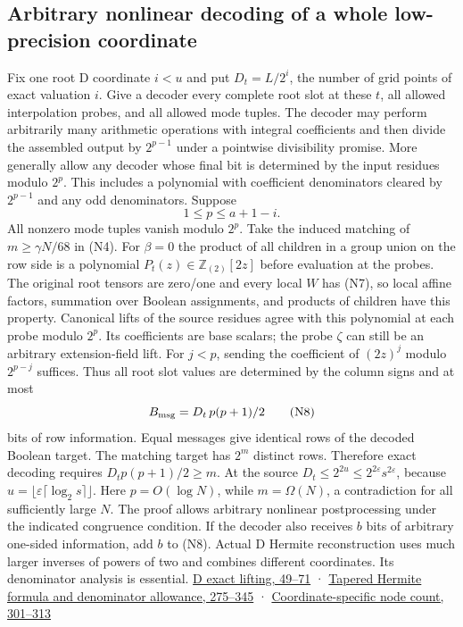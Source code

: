 \documentclass[
  11pt,
]{article}
\begin{document}
\subsection{Arbitrary nonlinear decoding of a whole low-precision
coordinate}\label{v8-arbitrary-nonlinear-decoding-of-a-whole-low-precision-coordinate}

Fix one root D coordinate \(i<u\) and put \(D_t=L/2^i\), the number of
grid points of exact valuation \(i\). Give a decoder every complete root
slot at these \(t\), all allowed interpolation probes, and all allowed
mode tuples. The decoder may perform arbitrarily many arithmetic
operations with integral coefficients and then divide the assembled
output by \(2^{p-1}\) under a pointwise divisibility promise. More
generally allow any decoder whose final bit is determined by the input
residues modulo \(2^p\). This includes a polynomial with coefficient
denominators cleared by \(2^{p-1}\) and any odd denominators. Suppose \[
 1\le p\le a+1-i.
\] All nonzero mode tuples vanish modulo \(2^p\). Take the induced
matching of \(m\ge \gamma N/68\) in (N4). For \(\beta=0\) the product of
all children in a group union on the row side is a polynomial
\(P_t(z)\in\mathbb Z_{(2)}[2z]\) before evaluation at the probes. The
original root tensors are zero/one and every local \(W\) has (N7), so
local affine factors, summation over Boolean assignments, and products
of children have this property. Canonical lifts of the source residues
agree with this polynomial at each probe modulo \(2^p\). Its
coefficients are base scalars; the probe \(\zeta\) can still be an
arbitrary extension-field lift. For \(j<p\), sending the coefficient of
\((2z)^j\) modulo \(2^{p-j}\) suffices. Thus all root slot values are
determined by the column signs and at most \[
 B_{\rm msg}=D_t\,p(p+1)/2
\tag{N8}
\] bits of row information. Equal messages give identical rows of the
decoded Boolean target. The matching target has \(2^m\) distinct rows.
Therefore exact decoding requires \(D_t p(p+1)/2\ge m\). At the source
\(D_t\le 2^{2u}\le 2^{2\varepsilon}s^{2\varepsilon}\), because
\(u=\lfloor\varepsilon\lceil\log_2 s\rceil\rfloor\). Here
\(p=O(\log N)\), while \(m=\Omega(N)\), a contradiction for all
sufficiently large \(N\). The proof allows arbitrary nonlinear
postprocessing under the indicated congruence condition. If the decoder
also receives \(b\) bits of arbitrary one-sided information, add \(b\)
to (N8). Actual D Hermite reconstruction uses much larger inverses of
powers of two and combines different coordinates. Its denominator
analysis is essential.
\href{https://github.com/openai/math/blob/main/preprints/The-Exponential-Time-Hypothesis-is-False-October-25-2026/build/quantitative-contraction.tex\#L49}{D
exact lifting, 49--71} ·
\href{https://github.com/openai/math/blob/main/preprints/The-Exponential-Time-Hypothesis-is-False-October-25-2026/build/quantitative-contraction.tex\#L275}{Tapered
Hermite formula and denominator allowance, 275--345} ·
\href{https://github.com/openai/math/blob/main/preprints/The-Exponential-Time-Hypothesis-is-False-October-25-2026/build/quantitative-contraction.tex\#L301}{Coordinate-specific
node count, 301--313}
\end{document}
